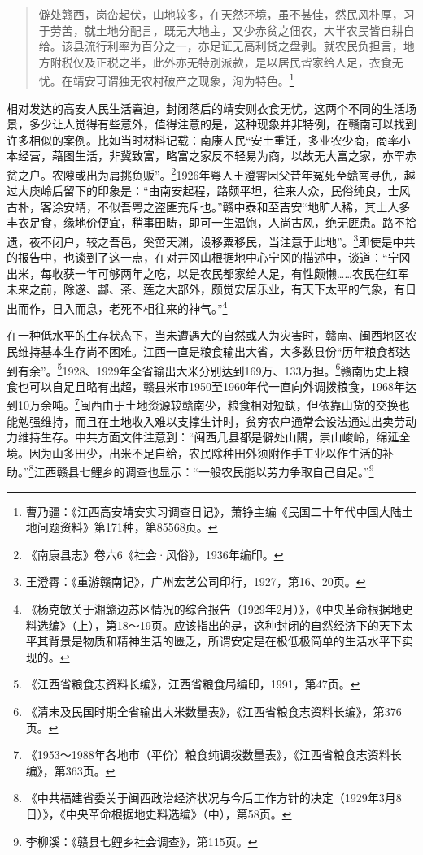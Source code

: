 \begin{quote}

僻处赣西，岗峦起伏，山地较多，在天然环境，虽不甚佳，然民风朴厚，习于劳苦，就土地分配言，既无大地主，又少赤贫之佃农，大半农民皆自耕自给。该县流行利率为百分之一，亦足证无高利贷之盘剥。就农民负担言，地方附税仅及正税之半，此外亦无特别派款，是以居民皆家给人足，衣食无忧。在靖安可谓独无农村破产之现象，洵为特色。\footnote{曹乃疆：《江西高安靖安实习调查日记》，萧铮主编《民国二十年代中国大陆土地问题资料》第171种，第85568页。}
\end{quote}


相对发达的高安人民生活窘迫，封闭落后的靖安则衣食无忧，这两个不同的生活场景，多少让人觉得有些意外，值得注意的是，这种现象并非特例，在赣南可以找到许多相似的案例。比如当时材料记载：南康人民“安土重迁，多业农少商，商率小本经营，藉图生活，非冀致富，略富之家反不轻易为商，以故无大富之家，亦罕赤贫之户。农隙或出为肩挑负贩”。\footnote{《南康县志》卷六6《社会·风俗》，1936年编印。}1926年粤人王澄霄因父昔年冤死至赣南寻仇，越过大庾岭后留下的印象是：“由南安起程，路颇平坦，往来人众，民俗纯良，士风古朴，客涂安靖，不似吾粤之盗匪充斥也。”赣中泰和至吉安“地旷人稀，其土人多丰衣足食，缘地价便宜，稍事田畴，即可一生温饱，人尚古风，绝无匪患。路不拾遗，夜不闭户，较之吾邑，奚啻天渊，设移粟移民，当注意于此地”。\footnote{王澄霄：《重游赣南记》，广州宏艺公司印行，1927，第16、20页。}即使是中共的报告中，也谈到了这一点，在对井冈山根据地中心宁冈的描述中，谈道：“宁冈出米，每收获一年可够两年之吃，以是农民都家给人足，有性颇懒……农民在红军未来之前，除遂、酃、茶、莲之大部外，颇觉安居乐业，有天下太平的气象，有日出而作，日入而息，老死不相往来的神气。”\footnote{《杨克敏关于湘赣边苏区情况的综合报告（1929年2月）》，《中央革命根据地史料选编》（上），第18～19页。应该指出的是，这种封闭的自然经济下的天下太平其背景是物质和精神生活的匮乏，所谓安定是在极低极简单的生活水平下实现的。}


在一种低水平的生存状态下，当未遭遇大的自然或人为灾害时，赣南、闽西地区农民维持基本生存尚不困难。江西一直是粮食输出大省，大多数县份“历年粮食都达到有余”。\footnote{《江西省粮食志资料长编》，江西省粮食局编印，1991，第47页。}1928、1929年全省输出大米分别达到169万、133万担。\footnote{《清末及民国时期全省输出大米数量表》，《江西省粮食志资料长编》，第376页。}赣南历史上粮食也可以自足且略有出超，赣县米市1950至1960年代一直向外调拨粮食，1968年达到10万余吨。\footnote{《1953～1988年各地市（平价）粮食纯调拨数量表》，《江西省粮食志资料长编》，第363页。}闽西由于土地资源较赣南少，粮食相对短缺，但依靠山货的交换也能勉强维持，而且在土地收入难以支撑生计时，贫穷农户通常会设法通过出卖劳动力维持生存。中共方面文件注意到：“闽西几县都是僻处山隅，崇山峻岭，绵延全境。因为山多田少，出米不足自给，农民除种田外须附作手工业以作生活的补助。”\footnote{《中共福建省委关于闽西政治经济状况与今后工作方针的决定（1929年3月8日）》，《中央革命根据地史料选编》（中），第58页。}江西赣县七鲤乡的调查也显示：“一般农民能以劳力争取自己自足。”\footnote{李柳溪：《赣县七鲤乡社会调查》，第115页。}


